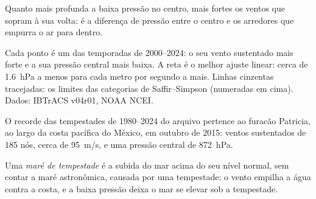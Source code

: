 Quanto mais profunda a baixa pressão no centro, mais fortes os ventos que
sopram à sua volta: é a diferença de pressão entre o centro e os arredores
que empurra o ar para dentro.

\begin{omfigure}

{\small Cada ponto é um  das temporadas de 2000--2024: o seu
vento sustentado mais forte e a sua pressão central mais baixa. A reta é o
melhor ajuste linear: cerca de \qty{1.6}{hPa} a menos para cada metro por
segundo a mais. Linhas cinzentas tracejadas: os limites das categorias de
Saffir--Simpson (numeradas em cima). Dados: IBTrACS v04r01, NOAA NCEI.}
\end{omfigure}

O recorde das tempestades de 1980--2024 do arquivo pertence ao furacão
Patricia, ao largo da costa pacífica do México, em outubro de 2015: ventos
sustentados de 185 nós, cerca de \qty{95}{m/s}, e uma pressão central de
\qty{872}{hPa}.

\begin{definition}\label{def:g10:storms-and-cyclones:storm-surge}
Uma \emph{maré de tempestade}
é a subida do mar acima do seu nível normal, sem contar a maré astronômica,
causada por uma tempestade: o vento empilha a água contra a costa, e a baixa
pressão deixa o mar se elevar sob a tempestade.
\end{definition}

